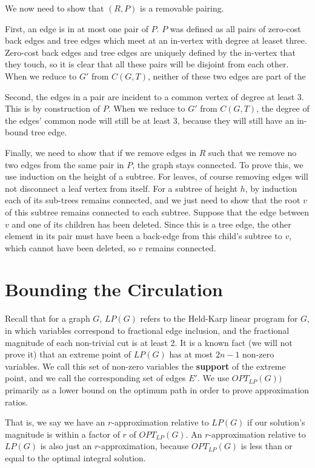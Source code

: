 \documentclass[12pt]{article}
\begin{document}
We now need to show that $(R, P)$ is a removable pairing.

First, an edge is in at most one pair of $P$.  $P$ was defined as all pairs of
zero-cost back edges and tree edges which meet at an in-vertex with degree at
leaset three.  Zero-cost back edges and tree edges are uniquely defined by the
in-vertex that they touch, so it is clear that all these pairs will be disjoint
from each other.  When we reduce to $G'$ from $C(G, T)$, neither of these two
edges are part of the 

Second, the edges in a pair are incident to a common vertex of degree at least
$3$.  This is by construction of $P$.  When we reduce to $G'$ from $C(G,T)$,  the
degree of the edges' common node will still be at least $3$, because they will
still have an in-bound tree edge.

Finally, we need to show that if we remove edges in $R$ such that we remove no
two edges from the same pair in $P$, the graph stays connected.  To prove this,
we use induction on the height of a subtree.  For leaves, of course removing
edges will not disconnect a leaf vertex from itself.  For a subtree of height
$h$, by induction each of its sub-trees remains connected, and we just need to
show that the root $v$ of this subtree remains connected to each subtree.  Suppose
that the edge between $v$ and one of its children has been deleted.  Since this
is a tree edge, the other element in its pair must have been a back-edge from
this child's subtree to $v$, which cannot have been deleted, so $v$ remains
connected.


\section{Bounding the Circulation}

Recall that for a graph $G$, $LP(G)$ refers to the Held-Karp linear program for
$G$, in which variables correspond to fractional edge inclusion, and the
fractional magnitude of each non-trivial cut is at least 2.  It is a known fact
(we will not prove it) that an extreme point of $LP(G)$ has at most $2n-1$
non-zero variables.  We call this set of non-zero variables the {\bf support} of
the extreme point, and we call the corresponding set of edges $E'$.  We use
$OPT_{LP}(G))$ primarily as a lower bound on the optimum path in order to prove
approximation ratios.

That is, we say we have an $r$-approximation relative to $LP(G)$ if our
solution's  magnitude is within a factor of $r$ of $OPT_{LP}(G)$.  An
$r$-approximation relative to $LP(G)$ is also just an $r$-approximation, because
$OPT_{LP}(G)$ is less than or equal to the optimal integral solution.
\end{document}
